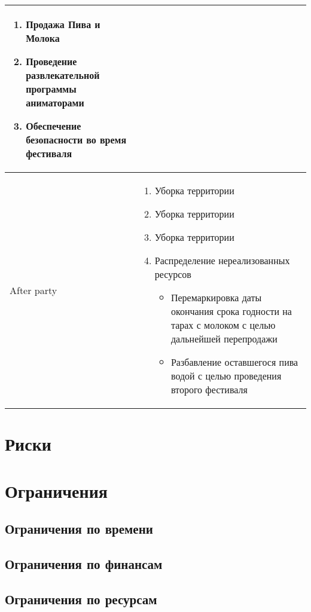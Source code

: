 \documentclass[a4paper,12pt]{article}
\begin{document}
\begin{center}
\begin{tabular}{|p{2cm}|p{13cm}|}
\begin{enumerate}
    \item Продажа Пива и Молока
    \item Проведение развлекательной программы аниматорами
    \item Обеспечение безопасности во время фестиваля
  \end{enumerate} \\
  \hline
  After party & 
  \begin{enumerate}
    \item Уборка территории
    \item Уборка территории
    \item Уборка территории
    \item Распределение нереализованных ресурсов
      \begin{itemize}
        \item Перемаркировка даты окончания срока годности на тарах с молоком с целью дальнейшей перепродажи
        \item Разбавление оставшегося пива водой с целью проведения второго фестиваля
      \end{itemize}
  \end{enumerate}\\
  \hline
\end{tabular}
\end{center}
\section{Риски}
\section{Ограничения}
\subsection{Ограничения по времени}
\subsection{Ограничения по финансам}
\subsection{Ограничения по ресурсам}
\end{document}
